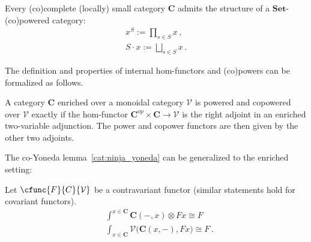     \begin{example}
        Every (co)complete (locally) small category $\mathbf{C}$ admits the structure of a $\mathbf{Set}$-(co)powered category:
        \begin{gather}
            x^S := \prod_{s\in S}x\,,\\
            S\cdot x := \bigsqcup_{s\in S}x\,.
        \end{gather}
    \end{example}

    The definition and properties of internal hom-functors and (co)powers can be formalized as follows.
    \begin{property}
        A category $\mathbf{C}$ enriched over a monoidal category $\mathcal{V}$ is powered and copowered over $\mathcal{V}$ exactly if the hom-functor $\mathbf{C}^{op}\times\mathbf{C}\rightarrow\mathcal{V}$ is the right adjoint in an enriched two-variable adjunction. The power and copower functors are then given by the other two adjoints.
    \end{property}

    The co-Yoneda lemma~\ref{cat:ninja_yoneda} can be generalized to the enriched setting:
    \begin{property}\label{cat:enriched_ninja_yoneda}
        Let $\cfunc{F}{C}{\mathcal{V}}$ be a contravariant functor (similar statements hold for covariant functors).
        \begin{align}
            &\int^{x\in\mathbf{C}}\mathbf{C}(-,x)\otimes Fx\cong F\\
            &\int_{x\in\mathbf{C}}\mathcal{V}\bigl(\mathbf{C}(x,-),Fx\bigr)\cong F\,.
        \end{align}
    \end{property}

